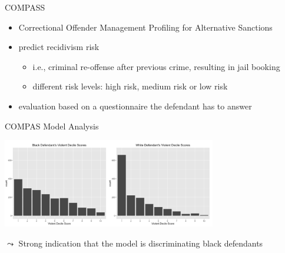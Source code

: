 \documentclass[aspectratio=169]{../latex_main/tntbeamer}  %
\begin{document}
\begin{frame}[c]{COMPASS}

    \begin{itemize}
        \item Correctional Offender Management Profiling for Alternative Sanctions 
        \item predict recidivism risk
        \begin{itemize}
            \item i.e., criminal re-offense after previous crime, resulting in jail booking
            \item different risk levels: high risk, medium risk or low risk
        \end{itemize}
        \item evaluation based on a questionnaire the defendant has to answer
    \end{itemize}	
	
\end{frame}

\begin{frame}[c]{COMPAS Model Analysis~}
    
    \centering
    \includegraphics[width=0.7\textwidth]{./figure/compass_black_white.PNG}
	
	$\leadsto$ Strong indication that the model is discriminating black defendants
	
\end{frame}
\end{document}

